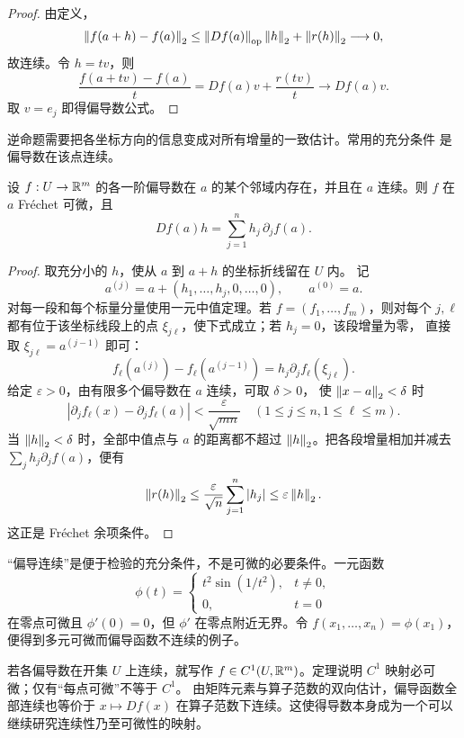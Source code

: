 \begin{proof}
由定义，
\[
 \left\lVert f(a+h)-f(a)\right\rVert_2
 \le \left\lVert Df(a)\right\rVert_{\mathrm{op}}\left\lVert h\right\rVert_2+\left\lVert r(h)\right\rVert_2
 \longrightarrow0,
\]
故连续。令 \(h=tv\)，则
\[
 \frac{f(a+tv)-f(a)}t
 =Df(a)v+\frac{r(tv)}t\longrightarrow Df(a)v.
\]
取 \(v=e_j\) 即得偏导数公式。
\end{proof}

逆命题需要把各坐标方向的信息变成对所有增量的一致估计。常用的充分条件
是偏导数在该点连续。

\begin{theorem}[连续偏导判据]
\label{thm:continuous-partials-imply-frechet}
设 \(f:U\to\mathbb{R}^m\) 的各一阶偏导数在 \(a\) 的某个邻域内存在，并且在
\(a\) 连续。则 \(f\) 在 \(a\) Fréchet 可微，且
\[
 Df(a)h=\sum_{j=1}^n h_j\,\partial_jf(a).
\]
\end{theorem}

\begin{proof}
取充分小的 \(h\)，使从 \(a\) 到 \(a+h\) 的坐标折线留在 \(U\) 内。
记
\[
 a^{(j)}=a+(h_1,\ldots,h_j,0,\ldots,0),
 \qquad a^{(0)}=a.
\]
对每一段和每个标量分量使用一元中值定理。若
$f=(f_1,\ldots,f_m)$，则对每个 $j,\ell$ 都有位于该坐标线段上的点
$\xi_{j\ell}$，使下式成立；若 $h_j=0$，该段增量为零，
直接取 $\xi_{j\ell}=a^{(j-1)}$ 即可：
\[
 f_\ell(a^{(j)})-f_\ell(a^{(j-1)})
 =h_j\partial_jf_\ell(\xi_{j\ell}).
\]
给定 $\varepsilon>0$，由有限多个偏导数在 $a$ 连续，可取 $\delta>0$，
使 $\left\lVert x-a\right\rVert_2<\delta$ 时
\[
 |\partial_jf_\ell(x)-\partial_jf_\ell(a)|
 <\frac{\varepsilon}{\sqrt{mn}}
 \quad(1\le j\le n, 1\le\ell\le m).
\]
当 $\left\lVert h\right\rVert_2<\delta$ 时，全部中值点与 $a$ 的距离都不超过
$\left\lVert h\right\rVert_2$。把各段增量相加并减去
$\sum_jh_j\partial_jf(a)$，便有
\[
 \left\lVert r(h)\right\rVert_2
 \le\frac{\varepsilon}{\sqrt n}\sum_{j=1}^n|h_j|
 \le\varepsilon\left\lVert h\right\rVert_2.
\]
这正是 Fréchet 余项条件。
\end{proof}

“偏导连续”是便于检验的充分条件，不是可微的必要条件。一元函数
\[
 \phi(t)=
 \begin{cases}t^2\sin(1/t^2),&t\ne0,\\0,&t=0\end{cases}
\]
在零点可微且 \(\phi'(0)=0\)，但 \(\phi'\) 在零点附近无界。令
\(f(x_1,\ldots,x_n)=\phi(x_1)\)，便得到多元可微而偏导函数不连续的例子。

若各偏导数在开集 \(U\) 上连续，就写作 \(f\in C^1(U,\mathbb{R}^m)\)。定理说明
\(C^1\) 映射必可微；仅有“每点可微”不等于 \(C^1\)。
由矩阵元素与算子范数的双向估计，偏导函数全部连续也等价于
\(x\mapsto Df(x)\) 在算子范数下连续。这使得导数本身成为一个可以
继续研究连续性乃至可微性的映射。

